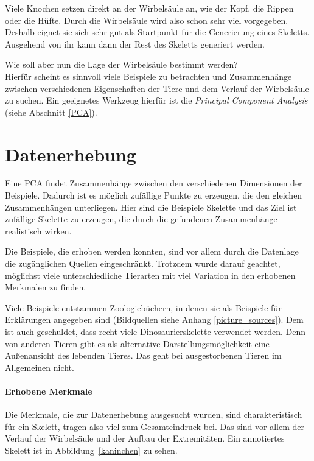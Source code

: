 Viele Knochen setzen direkt an der Wirbelsäule an, wie \zb der Kopf, die Rippen oder die Hüfte. Durch die Wirbelsäule wird also schon sehr viel vorgegeben.
Deshalb eignet sie sich sehr gut als Startpunkt für die Generierung eines Skeletts. Ausgehend von ihr kann dann der Rest des Skeletts generiert werden.

Wie soll aber nun die Lage der Wirbelsäule bestimmt werden?\\
Hierfür scheint es sinnvoll viele Beispiele zu betrachten und Zusammenhänge zwischen verschiedenen Eigenschaften der Tiere und dem Verlauf der Wirbelsäule zu suchen.
Ein geeignetes Werkzeug hierfür ist die \emph{Principal Component Analysis} (siehe Abschnitt \ref{PCA}).
 
 
 \section{Datenerhebung}
 \label{pca_input_data}
 
 Eine PCA findet Zusammenhänge zwischen den verschiedenen Dimensionen der Beispiele. Dadurch ist es möglich zufällige Punkte zu erzeugen, die den gleichen Zusammenhängen unterliegen. Hier sind die Beispiele Skelette und das Ziel ist zufällige Skelette zu erzeugen, die durch die gefundenen Zusammenhänge realistisch wirken.
 
 Die Beispiele, die erhoben werden konnten, sind vor allem durch die Datenlage \bzw die zugänglichen Quellen eingeschränkt. Trotzdem wurde darauf geachtet, möglichst viele unterschiedliche Tierarten mit viel Variation in den erhobenen Merkmalen zu finden.
 
 Viele Beispiele entstammen Zoologiebüchern, in denen sie als Beispiele für Erklärungen angegeben sind (Bildquellen siehe Anhang \ref{picture_sources}). Dem ist auch geschuldet, dass recht viele Dinosaurierskelette verwendet werden. Denn von anderen Tieren gibt es als alternative Darstellungsmöglichkeit eine Außenansicht des lebenden Tieres. Das geht bei ausgestorbenen Tieren im Allgemeinen nicht.
 
 \newpage
 \paragraph{Erhobene Merkmale}
 Die Merkmale, die zur Datenerhebung ausgesucht wurden, sind charakteristisch für ein Skelett, tragen also viel zum Gesamteindruck bei. Das sind vor allem der Verlauf der Wirbelsäule und der Aufbau der Extremitäten. Ein annotiertes Skelett ist in Abbildung~\ref{kaninchen} zu sehen.
 
